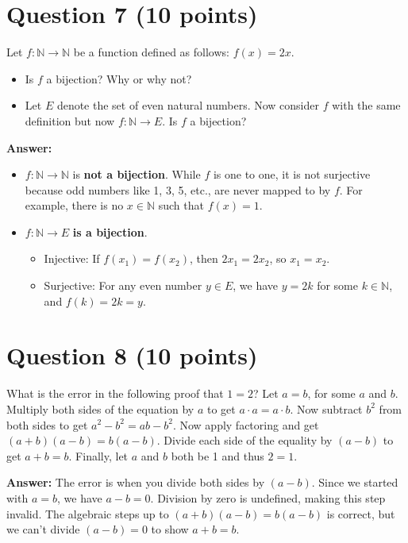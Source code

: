 \documentclass[12pt]{article}
\begin{document}
\section*{Question 7 (10 points)}
Let $f: \mathbb{N} \to \mathbb{N}$ be a function defined as follows: $f(x) = 2x$.
\begin{itemize}
    \item Is $f$ a bijection? Why or why not?
    \item Let $E$ denote the set of even natural numbers. Now consider $f$ with the same definition but now $f: \mathbb{N} \to E$. Is $f$ a bijection?
\end{itemize}

\textbf{Answer:}
\begin{itemize}
    \item $f: \mathbb{N} \to \mathbb{N}$ is \textbf{not a bijection}. While $f$ is one to one, it is not surjective because odd numbers like 1, 3, 5, etc., are never mapped to by $f$. For example, there is no $x \in \mathbb{N}$ such that $f(x) = 1$.
    
    \item $f: \mathbb{N} \to E$ \textbf{is a bijection}. 
    \begin{itemize}
        \item Injective: If $f(x_1) = f(x_2)$, then $2x_1 = 2x_2$, so $x_1 = x_2$.
        \item Surjective: For any even number $y \in E$, we have $y = 2k$ for some $k \in \mathbb{N}$, and $f(k) = 2k = y$.
    \end{itemize}
\end{itemize}

\section*{Question 8 (10 points)}
What is the error in the following proof that $1 = 2$? Let $a = b$, for some $a$ and $b$. Multiply both sides of the equation by $a$ to get $a \cdot a = a \cdot b$. Now subtract $b^2$ from both sides to get $a^2 - b^2 = ab - b^2$. Now apply factoring and get $(a + b)(a - b) = b(a - b)$. Divide each side of the equality by $(a - b)$ to get $a + b = b$. Finally, let $a$ and $b$ both be 1 and thus $2 = 1$.

\textbf{Answer:}
The error is when you divide both sides by $(a - b)$. Since we started with $a = b$, we have $a - b = 0$. Division by zero is undefined, making this step invalid. The algebraic steps up to $(a + b)(a - b) = b(a - b)$ is correct, but we can't divide $(a - b) = 0$ to show $a + b = b$.
\end{document}
